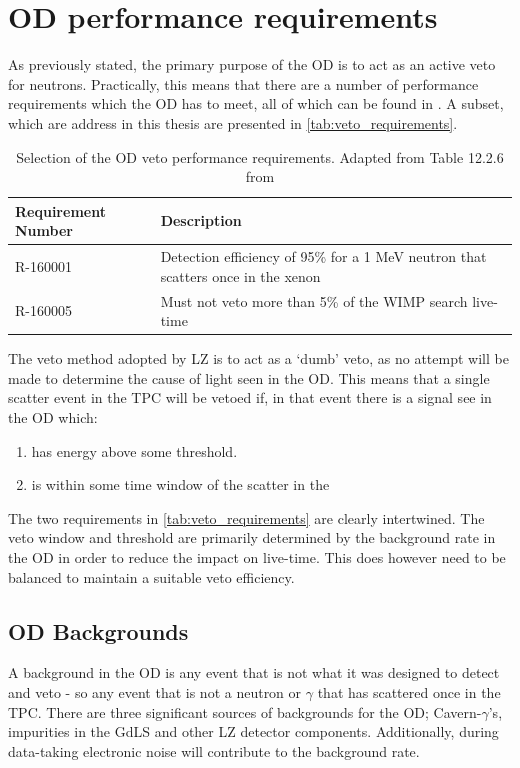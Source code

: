 \section{OD performance requirements}
\label{sec:simulated_od_requirements}
\par
As previously stated, the primary purpose of the OD is to act as an active veto for neutrons.
Practically, this means that there are a number of performance requirements which the OD has to meet, all of which can be found in \cite{LZ_TechnicalDesignReview_ref}.
A subset, which are address in this thesis are presented in \autoref{tab:veto_requirements}.

\begin{table}[!htbp]
    \centering
    \begin{tabular}{p{}p{}} %
    \hline
    {Requirement Number} & {Description} \\ \hline
    R-160001             & Detection efficiency of 95\% for a 1 MeV neutron that scatters once in the xenon \\
    R-160005             & Must not veto more than 5\% of the WIMP search live-time
    \end{tabular}
    \caption{Selection of the OD veto performance requirements. Adapted from Table 12.2.6 from \cite{LZ_TechnicalDesignReview_ref}}
    \label{tab:veto_requirements}
\end{table} 

\par
The veto method adopted by LZ is to act as a `dumb' veto, as no attempt will be made to determine the cause of light seen in the OD.
This means that a single scatter event in the TPC will be vetoed if, in that event there is a signal see in the OD which:
\begin{enumerate}
    \item has energy above some threshold.
    \item is within some time window of the scatter in the 
\end{enumerate}
The two requirements in \autoref{tab:veto_requirements} are clearly intertwined.
The veto window and threshold are primarily determined by the background rate in the OD in order to reduce the impact on live-time.
This does however need to be balanced to maintain a suitable veto efficiency.

\subsection{OD Backgrounds}
\label{sec:simulated_od_backgrounds}
\par
A background in the OD is any event that is not what it was designed to detect and veto - so any event that is not a neutron or $\gamma$ that has scattered once in the TPC.
There are three significant sources of backgrounds for the OD; Cavern-$\gamma$'s, impurities in the GdLS and other LZ detector components.
Additionally, during data-taking electronic noise will contribute to the background rate. 

